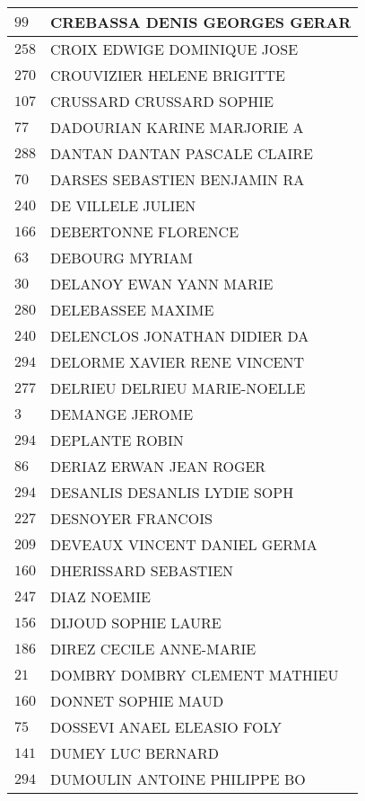 \begin{xltabular}{\linewidth}{|l|X|}
    \hline
    $99$ & CREBASSA DENIS GEORGES GERAR \\
    \hline
    $258$ & CROIX EDWIGE DOMINIQUE JOSE \\
    \hline
    $270$ & CROUVIZIER HELENE BRIGITTE \\
    \hline
    $107$ & CRUSSARD CRUSSARD SOPHIE \\
    \hline
    $77$ & DADOURIAN KARINE MARJORIE A \\
    \hline
    $288$ & DANTAN DANTAN PASCALE CLAIRE \\
    \hline
    $70$ & DARSES SEBASTIEN BENJAMIN RA \\
    \hline
    $240$ & DE VILLELE JULIEN \\
    \hline
    $166$ & DEBERTONNE FLORENCE \\
    \hline
    $63$ & DEBOURG MYRIAM \\
    \hline
    $30$ & DELANOY EWAN YANN MARIE \\
    \hline
    $280$ & DELEBASSEE MAXIME \\
    \hline
    $240$ & DELENCLOS JONATHAN DIDIER DA \\
    \hline
    $294$ & DELORME XAVIER RENE VINCENT \\
    \hline
    $277$ & DELRIEU DELRIEU MARIE-NOELLE \\
    \hline
    $3$ & DEMANGE JEROME \\
    \hline
    $294$ & DEPLANTE ROBIN \\
    \hline
    $86$ & DERIAZ ERWAN JEAN ROGER \\
    \hline
    $294$ & DESANLIS DESANLIS LYDIE SOPH \\
    \hline
    $227$ & DESNOYER FRANCOIS \\
    \hline
    $209$ & DEVEAUX VINCENT DANIEL GERMA \\
    \hline
    $160$ & DHERISSARD SEBASTIEN \\
    \hline
    $247$ & DIAZ NOEMIE \\
    \hline
    $156$ & DIJOUD SOPHIE LAURE \\
    \hline
    $186$ & DIREZ CECILE ANNE-MARIE \\
    \hline
    $21$ & DOMBRY DOMBRY CLEMENT MATHIEU \\
    \hline
    $160$ & DONNET SOPHIE MAUD \\
    \hline
    $75$ & DOSSEVI ANAEL ELEASIO FOLY \\
    \hline
    $141$ & DUMEY LUC BERNARD \\
    \hline
    $294$ & DUMOULIN ANTOINE PHILIPPE BO \\

\end{xltabular}
